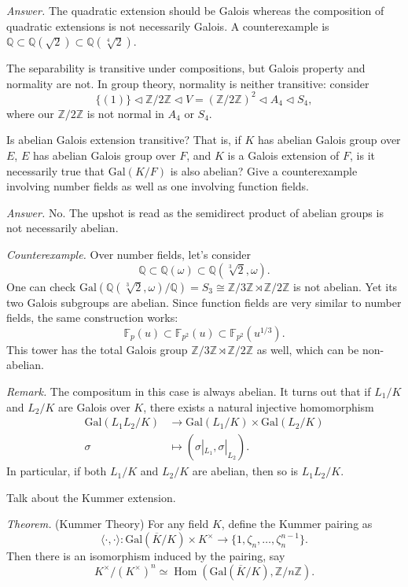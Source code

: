 \documentclass{mathproblems}
\newcommand\F{\mathbb{F}}
\newcommand\Q{\mathbb{Q}}
\newcommand\Z{\mathbb{Z}}
\newcommand\Gal{\mathrm{Gal}}
\DeclareMathOperator{\Hom}{Hom}
\begin{document}
\begin{questions}
\textit{Answer.} The quadratic extension should be Galois whereas the composition of quadratic extensions is not necessarily Galois. A counterexample is $\Q\subset \Q(\sqrt{2})\subset \Q(\sqrt[4]{2})$.

The separability is transitive under compositions, but Galois property and normality are not. In group theory, normality is neither transitive: consider
$$
\{(1)\} \triangleleft \Z/2\Z \triangleleft V=(\Z/2\Z)^2 \triangleleft A_{4} \triangleleft S_{4},
$$
where our $\Z/2\Z$ is not normal in $A_4$ or $S_4$.

\miquestion
{\color{blue} Is abelian Galois extension transitive? That is, if $K$ has abelian Galois group over $E$, $E$ has abelian Galois group over $F$, and $K$ is a Galois extension of $F$, is it necessarily true that $\Gal(K / F)$ is also abelian? Give a counterexample involving number fields as well as one involving function fields.}

\textit{Answer.} No. The upshot is read as the semidirect product of abelian groups is not necessarily abelian.

\textit{Counterexample.} Over number fields, let's consider 
$$
\Q \subset \Q(\omega) \subset \Q(\sqrt[3]{2},\omega).
$$
One can check $\Gal(\Q(\sqrt[3]{2},\omega)/\Q)=S_3\cong \Z/3\Z\rtimes \Z/2\Z$ is not abelian. Yet its two Galois subgroups are abelian. Since function fields are very similar to number fields, the same construction works:
$$
\F_p(u) \subset \F_{p^2}(u) \subset \F_{p^2}(u^{1/3}).
$$
This tower has the total Galois group $\Z/3\Z\rtimes \Z/2\Z$ as well, which can be non-abelian. 

\textit{Remark.} The compositum in this case is always abelian. It turns out that if $L_1/K$ and $L_2/K$ are Galois over $K$, there exists a natural injective homomorphism
$$
\begin{aligned}
\Gal(L_1L_2/K) & \longrightarrow \Gal(L_1/K)\times \Gal(L_2/K)\\
\sigma & \longmapsto (\sigma|_{L_1},\sigma|_{L_2}).
\end{aligned}
$$
In particular, if both $L_1/K$ and $L_2/K$ are abelian, then so is $L_1L_2/K$.

\miquestion
{\color{blue} Talk about the Kummer extension.}

{\color{violet}
\textit{Theorem.} (Kummer Theory) For any field $K$, define the Kummer pairing as
$$
\langle\cdot,\cdot\rangle: \Gal(\overline{K}/K)\times K^\times\to \{1,\zeta_n,\ldots,\zeta_n^{n-1}\}.
$$
Then there is an isomorphism induced by the pairing, say
$$
K^\times/(K^\times)^n \simeq \Hom(\Gal(\overline{K}/K),\Z/n\Z).
$$}


\end{questions}
\end{document}

